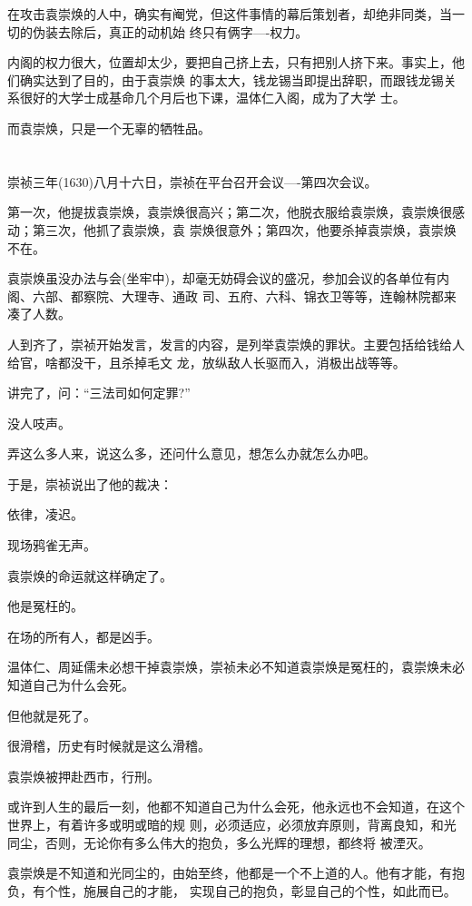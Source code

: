 \documentclass[11pt,a4paper,onecolumn]{article}
\begin{document}
在攻击袁崇焕的人中，确实有阉党，但这件事情的幕后策划者，却绝非同类，当一切的伪装去除后，真正的动机始
终只有俩字----权力。

内阁的权力很大，位置却太少，要把自己挤上去，只有把别人挤下来。事实上，他们确实达到了目的，由于袁崇焕
的事太大，钱龙锡当即提出辞职，而跟钱龙锡关系很好的大学士成基命几个月后也下课，温体仁入阁，成为了大学
士。

而袁崇焕，只是一个无辜的牺牲品。

\section[\thesection]{}

崇祯三年(1630)八月十六日，崇祯在平台召开会议----第四次会议。

第一次，他提拔袁崇焕，袁崇焕很高兴；第二次，他脱衣服给袁崇焕，袁崇焕很感动；第三次，他抓了袁崇焕，袁
崇焕很意外；第四次，他要杀掉袁崇焕，袁崇焕不在。

袁崇焕虽没办法与会(坐牢中)，却毫无妨碍会议的盛况，参加会议的各单位有内阁、六部、都察院、大理寺、通政
司、五府、六科、锦衣卫等等，连翰林院都来凑了人数。

人到齐了，崇祯开始发言，发言的内容，是列举袁崇焕的罪状。主要包括给钱给人给官，啥都没干，且杀掉毛文
龙，放纵敌人长驱而入，消极出战等等。

讲完了，问：``三法司如何定罪?''

没人吱声。

弄这么多人来，说这么多，还问什么意见，想怎么办就怎么办吧。

于是，崇祯说出了他的裁决：

依律，凌迟。

现场鸦雀无声。

袁崇焕的命运就这样确定了。

他是冤枉的。

在场的所有人，都是凶手。

温体仁、周延儒未必想干掉袁崇焕，崇祯未必不知道袁崇焕是冤枉的，袁崇焕未必知道自己为什么会死。

但他就是死了。

很滑稽，历史有时候就是这么滑稽。

袁崇焕被押赴西市，行刑。

或许到人生的最后一刻，他都不知道自己为什么会死，他永远也不会知道，在这个世界上，有着许多或明或暗的规
则，必须适应，必须放弃原则，背离良知，和光同尘，否则，无论你有多么伟大的抱负，多么光辉的理想，都终将
被湮灭。

袁崇焕是不知道和光同尘的，由始至终，他都是一个不上道的人。他有才能，有抱负，有个性，施展自己的才能，
实现自己的抱负，彰显自己的个性，如此而已。
\end{document}
